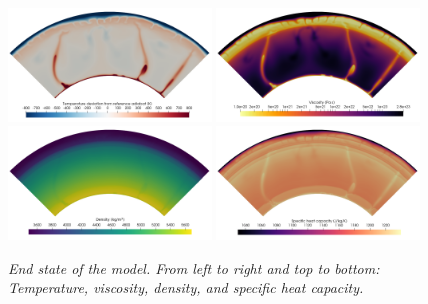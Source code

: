 \begin{figure}
  \includegraphics[width=0.48\textwidth]{cookbooks/steinberger/doc/temperature.png}
  \includegraphics[width=0.48\textwidth]{cookbooks/steinberger/doc/viscosity.png}
  \includegraphics[width=0.48\textwidth]{cookbooks/steinberger/doc/density.png}
  \includegraphics[width=0.48\textwidth]{cookbooks/steinberger/doc/specific_heat.png}
  \caption{\it End state of the model. From left to right and top to bottom: Temperature, viscosity, density, and specific heat capacity.}
  \label{fig:steinberger-end-state}
\end{figure}


